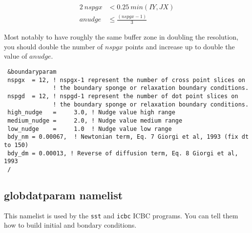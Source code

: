 \begin{align}
	2\ nspgx &< 0.25\ min(IY,JX) \\
	anudge &\le \frac{(nspgx-1)}{3}
\end{align}

Most notably to have roughly the same buffer zone in doubling the resolution,
you should double the number of $nspgx$ points and increase up to double the
value of $anudge$.

{\footnotesize
\begin{Verbatim}
 &boundaryparam
 nspgx  = 12, ! nspgx-1 represent the number of cross point slices on
              ! the boundary sponge or relaxation boundary conditions.
 nspgd  = 12, ! nspgd-1 represent the number of dot point slices on
              ! the boundary sponge or relaxation boundary conditions.
 high_nudge   =     3.0, ! Nudge value high range
 medium_nudge =     2.0, ! Nudge value medium range
 low_nudge    =     1.0  ! Nudge value low range
 bdy_nm = 0.00067,  ! Newtonian term, Eq. 7 Giorgi et al, 1993 (fix dt to 150)
 bdy_dm = 0.00013, ! Reverse of diffusion term, Eq. 8 Giorgi et al, 1993 
 /
\end{Verbatim}
}

\subsection{globdatparam namelist}
\label{globparam}

This namelist is used by the \verb=sst= and \verb=icbc= ICBC programs. You can
tell them how to build initial and bondary conditions.

